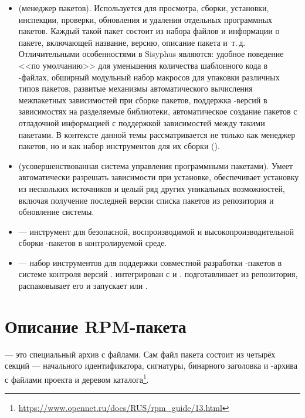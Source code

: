 \begin{itemize}
	\item {} (менеджер пакетов). Используется для просмотра, сборки, установки, инспекции, 
		проверки, обновления и удаления отдельных программных пакетов. Каждый такой пакет состоит 
		из набора файлов и информации о пакете, включающей название, версию, описание пакета и~т.\,д. 
		Отличительными особенностями  в Sisyphus являются: удобное поведение <<по умолчанию>> 
		для уменьшения количества шаблонного кода в -файлах, обширный модульный набор 
		макросов для упаковки различных типов пакетов, развитые механизмы автоматического вычисления 
		межпакетных зависимостей при сборке пакетов, поддержка -версий в зависимостях на 
		разделяемые библиотеки, автоматическое создание пакетов с отладочной информацией с поддержкой 
		зависимостей между такими пакетами. В контексте данной темы  рассматривается не только 
		как менеджер пакетов, но и как набор инструментов для их сборки (). 
	\item {} (усовершенствованная система управления программными пакетами). Умеет автоматически 
		разрешать зависимости при установке, обеспечивает установку из нескольких источников и целый 
		ряд других уникальных возможностей, включая получение последней версии списка пакетов из 
		репозитория и обновление системы.
	\item {} --- инструмент для безопасной, воспроизводимой и высокопроизводительной сборки 
		-пакетов в контролируемой среде.
	\item {} --- набор инструментов для поддержки совместной разработки -пакетов в 
		системе контроля версий .  интегрирован с  и . 
		 подготавливает  из  репозитория, распаковывает его и запускает 
		 или .
\end{itemize}


\section{Описание RPM-пакета}
 --- это специальный архив с файлами. Сам файл пакета состоит из четырёх секций --- 
начального идентификатора, сигнатуры, бинарного заголовка и -архива с файлами проекта и деревом 
каталога\footnote{\href{https://www.opennet.ru/docs/RUS/rpm_guide/13.html}{https://www.opennet.ru/docs/RUS/rpm\_guide/13.html}}.

